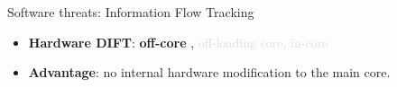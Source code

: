 \begin{frame}{Software threats: Information Flow Tracking}
    \begin{minipage}[c]{0.45\textwidth}
        \begin{block}{}
            \begin{itemize}
                [square]
                \justifying
                    \item \textbf{Hardware DIFT}: \textbf{off-core} \cite{KDK-09-dsn}, \textcolor{Gainsboro}{off-loading core, in-core}
            \end{itemize}
        \end{block}
        
        \begin{exampleblock}{}
            \begin{itemize}
                [square]
                \justifying
                \item \textbf{Advantage}: no internal hardware modification to the main core.
            \end{itemize}
        \end{exampleblock}
        

\end{minipage}
\end{frame}
